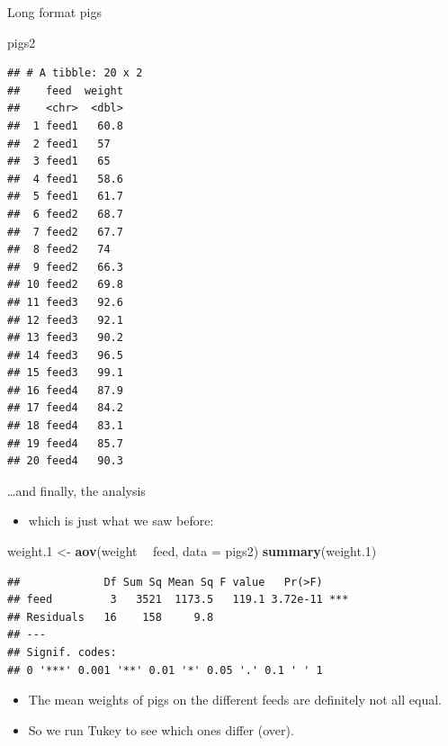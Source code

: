 \documentclass[ignorenonframetext,]{beamer}
\newenvironment{Shaded}{\begin{snugshade}}{\end{snugshade}}
\newcommand{\DataTypeTok}[1]{\textcolor[rgb]{0.13,0.29,0.53}{#1}}
\newcommand{\FloatTok}[1]{\textcolor[rgb]{0.00,0.00,0.81}{#1}}
\newcommand{\KeywordTok}[1]{\textcolor[rgb]{0.13,0.29,0.53}{\textbf{#1}}}
\newcommand{\NormalTok}[1]{#1}
\newcommand{\OperatorTok}[1]{\textcolor[rgb]{0.81,0.36,0.00}{\textbf{#1}}}
\newcommand{\StringTok}[1]{\textcolor[rgb]{0.31,0.60,0.02}{#1}}
\providecommand{\tightlist}{%
  \setlength{\itemsep}{0pt}\setlength{\parskip}{0pt}}
\begin{document}
\begin{frame}[fragile]{Long format pigs}
\protect\hypertarget{long-format-pigs}{}

\begin{Shaded}
\begin{Highlighting}[]
\NormalTok{pigs2}
\end{Highlighting}
\end{Shaded}

\begin{verbatim}
## # A tibble: 20 x 2
##    feed  weight
##    <chr>  <dbl>
##  1 feed1   60.8
##  2 feed1   57  
##  3 feed1   65  
##  4 feed1   58.6
##  5 feed1   61.7
##  6 feed2   68.7
##  7 feed2   67.7
##  8 feed2   74  
##  9 feed2   66.3
## 10 feed2   69.8
## 11 feed3   92.6
## 12 feed3   92.1
## 13 feed3   90.2
## 14 feed3   96.5
## 15 feed3   99.1
## 16 feed4   87.9
## 17 feed4   84.2
## 18 feed4   83.1
## 19 feed4   85.7
## 20 feed4   90.3
\end{verbatim}

\end{frame}

\begin{frame}[fragile]{\ldots{}and finally, the analysis}
\protect\hypertarget{and-finally-the-analysis}{}

\begin{itemize}
\tightlist
\item
  which is just what we saw before:
\end{itemize}

\begin{Shaded}
\begin{Highlighting}[]
\NormalTok{weight}\FloatTok{.1}\NormalTok{ <-}\StringTok{ }\KeywordTok{aov}\NormalTok{(weight }\OperatorTok{~}\StringTok{ }\NormalTok{feed, }\DataTypeTok{data =}\NormalTok{ pigs2)}
\KeywordTok{summary}\NormalTok{(weight}\FloatTok{.1}\NormalTok{)}
\end{Highlighting}
\end{Shaded}

\begin{verbatim}
##             Df Sum Sq Mean Sq F value   Pr(>F)    
## feed         3   3521  1173.5   119.1 3.72e-11 ***
## Residuals   16    158     9.8                     
## ---
## Signif. codes:  
## 0 '***' 0.001 '**' 0.01 '*' 0.05 '.' 0.1 ' ' 1
\end{verbatim}

\begin{itemize}
\tightlist
\item
  The mean weights of pigs on the different feeds are definitely not all
  equal.
\item
  So we run Tukey to see which ones differ (over).
\end{itemize}

\end{frame}
\end{document}
